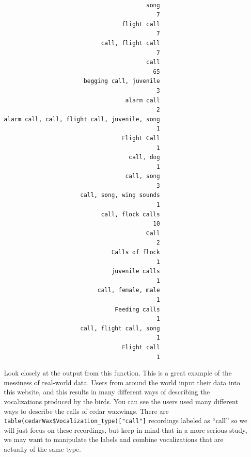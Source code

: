 \documentclass[]{krantz}
\begin{document}
\begin{verbatim}

                                         song 
                                            7 
                                  flight call 
                                            7 
                            call, flight call 
                                            7 
                                         call 
                                           65 
                       begging call, juvenile 
                                            3 
                                   alarm call 
                                            2 
alarm call, call, flight call, juvenile, song 
                                            1 
                                  Flight Call 
                                            1 
                                    call, dog 
                                            1 
                                   call, song 
                                            3 
                      call, song, wing sounds 
                                            1 
                            call, flock calls 
                                           10 
                                         Call 
                                            2 
                               Calls of flock 
                                            1 
                               juvenile calls 
                                            1 
                           call, female, male 
                                            1 
                                Feeding calls 
                                            1 
                      call, flight call, song 
                                            1 
                                  Flight call 
                                            1 
\end{verbatim}

Look closely at the output from this function. This is a great example of the messiness of real-world data. Users from around the world input their data into this website, and this results in many different ways of describing the vocalizations produced by the birds. You can see the users used many different ways to describe the calls of cedar waxwings. There are \texttt{table(cedarWax\$Vocalization\_type){[}"call"{]}} recordings labeled as ``call'' so we will just focus on these recordings, but keep in mind that in a more serious study, we may want to manipulate the labels and combine vocalizations that are actually of the same type.
\end{document}

